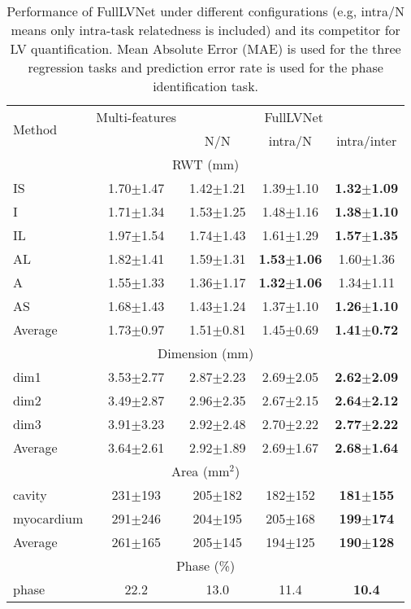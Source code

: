 \documentclass{llncs}
\begin{document}
\begin{table*}[t]
	\caption{Performance of FullLVNet under different configurations (e.g, intra/N means only intra-task relatedness is included) and its competitor for LV quantification. Mean Absolute Error (MAE) is used for the three regression tasks and prediction error rate is used for the phase identification task.}
	\label{table_results}
	\centering
	\begin{tabular}{l|c|ccc}
		\hline
		\multirow{2}{*}{Method} & Multi-features & \multicolumn{3}{c}{FullLVNet}\\ \cline{3-5}
		&\cite{zhen2015multi} &N/N&intra/N&intra/inter\\
		\hline
		\multicolumn{5}{c}{RWT (mm)}\\
		\hline
		IS&1.70$\pm$1.47&1.42$\pm$1.21&1.39$\pm$1.10&\textbf{1.32$\pm$1.09}\\
		I&1.71$\pm$1.34&1.53$\pm$1.25&1.48$\pm$1.16&\textbf{1.38$\pm$1.10}\\
		IL&1.97$\pm$1.54&1.74$\pm$1.43&1.61$\pm$1.29&\textbf{1.57$\pm$1.35}\\
		AL&1.82$\pm$1.41&1.59$\pm$1.31&\textbf{1.53$\pm$1.06}&1.60$\pm$1.36\\
		A&1.55$\pm$1.33&1.36$\pm$1.17&\textbf{1.32$\pm$1.06}&1.34$\pm$1.11\\
		AS&1.68$\pm$1.43&1.43$\pm$1.24&1.37$\pm$1.10&\textbf{1.26$\pm$1.10}\\
		\hline
		Average&1.73$\pm$0.97&1.51$\pm$0.81&1.45$\pm$0.69&\textbf{1.41$\pm$0.72}\\
		\hline
		\multicolumn{5}{c}{Dimension (mm)}\\
		\hline
         dim1&3.53$\pm$2.77&2.87$\pm$2.23&2.69$\pm$2.05&\textbf{2.62$\pm$2.09}\\
         dim2&3.49$\pm$2.87&2.96$\pm$2.35&2.67$\pm$2.15&\textbf{2.64$\pm$2.12}\\
         dim3&3.91$\pm$3.23&2.92$\pm$2.48&2.70$\pm$2.22&\textbf{2.77$\pm$2.22}\\
         \hline
         Average&3.64$\pm$2.61&2.92$\pm$1.89&2.69$\pm$1.67&\textbf{2.68$\pm$1.64}\\
		\hline
		\multicolumn{5}{c}{Area (mm$^2$)}\\
		\hline
		cavity&231$\pm$193&205$\pm$182&182$\pm$152&\textbf{181$\pm$155}\\
		myocardium&291$\pm$246&204$\pm$195&205$\pm$168&\textbf{199$\pm$174}\\
		\hline
		Average&261$\pm$165&205$\pm$145&194$\pm$125&\textbf{190$\pm$128}\\
		\hline
		\multicolumn{5}{c}{Phase (\%)}\\
		\hline
		phase&22.2&13.0&11.4&\textbf{10.4}\\
		\hline
	\end{tabular}
\end{table*}
\end{document}
